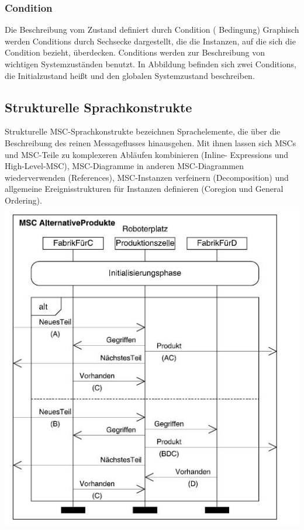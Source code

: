 \subsubsection{Condition}
Die Beschreibung vom Zustand definiert durch Condition ( Bedingung)
Graphisch werden Conditions durch Sechsecke dargestellt,
die die Instanzen, auf die sich die Condition bezieht,
überdecken. Conditions werden zur Beschreibung von
wichtigen Systemzuständen benutzt. In Abbildung befinden sich
zwei Conditions, die Initialzustand heißt und den globalen Systemzustand beschreiben.


\subsection{Strukturelle Sprachkonstrukte}
Strukturelle MSC-Sprachkonstrukte bezeichnen Sprachelemente,
die über die Beschreibung des reinen Messageflusses
hinausgehen. Mit ihnen lassen sich MSCs und
MSC-Teile zu komplexeren Abläufen kombinieren (Inline-
Expressions und High-Level-MSC), MSC-Diagramme in
anderen MSC-Diagrammen wiederverwenden (References),
MSC-Instanzen verfeinern (Decomposition) und allgemeine
Ereignisstrukturen für Instanzen definieren (Coregion und
General Ordering)\cite{MT009}.\\



\includegraphics[scale=1]{Graphics/MSCmit.jpg}

